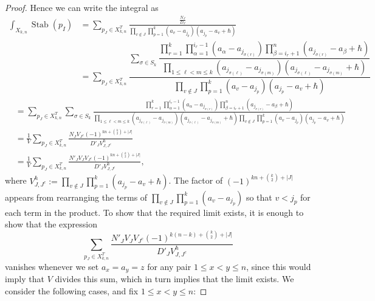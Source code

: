 \documentclass[10pt,a4paper]{amsart}
\DeclareMathOperator{\Stab}{Stab}
\begin{document}
\begin{proof}
Hence we can write the integral as
\begin{align*}
\int_{X_{k,n}}\Stab(p_{I})&=\sum_{p_{J}\in X_{k,n}^{T}}\frac{\frac{N_{J}}{D_{J}}}{\prod\limits_{v\not \in J} \prod\limits_{p = 1}^{k}(a_v - a_{j_p}) (a_{j_p}-a_v+\hbar)}\\
&=\sum_{p_J\in X_{k,n}^T}\dfrac{\sum\limits_{\sigma \in S_k} \dfrac{\prod\limits_{r = 1}^k \prod\limits_{\alpha = 1}^{i_{r} - 1} \left(a_{\alpha} - a_{j_{\sigma(r)}}\right) \prod\limits_{\beta = i_r + 1}^n \left(a_{j_{\sigma(r)}} - a_{\beta} + \hbar\right) }{\prod\limits_{1 \leq \ell < m \leq k} \left(a_{j_{\sigma(\ell)}} - a_{j_{\sigma(m)}}\right) \left(a_{j_{\sigma(\ell)}} - a_{j_{\sigma(m)}} + \hbar\right)}}{\prod\limits_{v\not \in J} \prod\limits_{p = 1}^{k}\left(a_v - a_{j_p}\right) \left(a_{j_p}-a_v+\hbar\right)}
\end{align*}
\begin{align*}
&=\sum_{p_J\in X_{k,n}^T}\sum\limits_{\sigma \in S_k} \frac{\prod\limits_{r = 1}^k \prod\limits_{\alpha = 1}^{i_{r} - 1} \left(a_{\alpha} - a_{j_{\sigma(r)}}\right) \prod\limits_{\beta = i_r + 1}^n \left(a_{j_{\sigma(r)}} - a_{\beta} + \hbar\right) }{\prod\limits_{1 \leq \ell < m \leq k} \left(a_{j_{\sigma(\ell)}} - a_{j_{\sigma(m)}}\right) \left(a_{j_{\sigma(\ell)}} - a_{j_{\sigma(m)}} + \hbar\right)\prod\limits_{v\not \in J} \prod\limits_{p = 1}^{k}\left(a_v - a_{j_p}\right) \left(a_{j_p}-a_v+\hbar\right)}\\
&=\frac{1}{V}\sum_{p_{J}\in X_{k,n}^{T}}\frac{N_{J}V_{J^{c}}(-1)^{kn+\binom{k}{2}+|J|}}{D'_{J}V_{J,J^{c}}^{\hbar}}\\
&=\frac{1}{V}\sum_{p_{J}\in X_{k,n}^{T}}\frac{N'_{J}V_{J}V_{J^{c}}(-1)^{kn+\binom{k}{2}+|J|}}{D'_{J}V_{J,J^{c}}^{\hbar}},
\end{align*}
where $V_{J,J^c}^{\hbar}:= \prod_{v \not \in J}\prod_{p = 1}^{k} \left(a_{j_p} - a_v + \hbar\right)$. The factor of $(-1)^{kn+\binom{k}{2}+|J|}$ appears from rearranging the terms of $\prod\limits_{v\notin J}\prod\limits_{p=1}^{k}\left(a_{v}-a_{j_{p}}\right)$ so that $v<j_{p}$ for each term in the product.\newline
To show that the required limit exists, it is enough to show that the expression 
\begin{equation}\label{eq:thesum}\sum_{p_{J}\in X_{k,n}^{T}}\frac{N'_{J}V_{J}V_{J^{c}}(-1)^{k(n-k)+\binom{k}{2}+|J|}}{D'_{J}V_{J,J^{c}}^{\hbar}}\end{equation}
vanishes whenever we set $a_{x}=a_{y}=z$ for any pair $1\leq x<y\leq n$, since this would imply that $V$ divides this sum, which in turn implies that the limit exists. We consider the following cases, and fix $1\leq x<y\leq n$:\newline



\end{proof}
\end{document}
